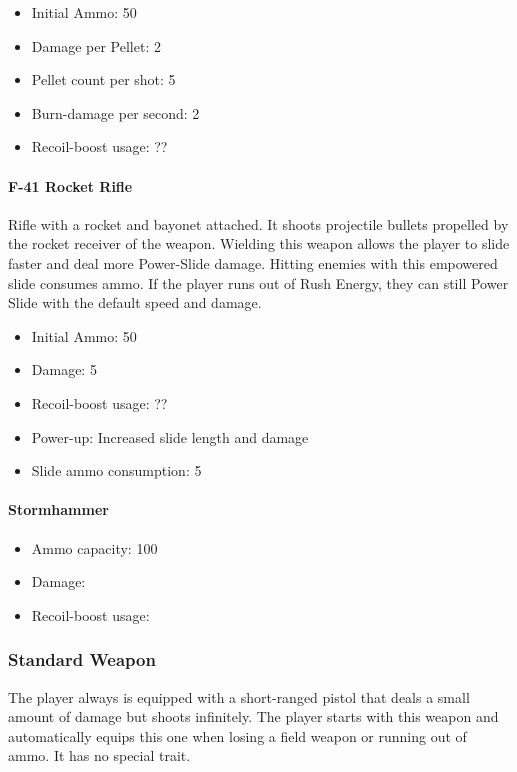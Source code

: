 \documentclass[12pt]{article}
\begin{document}
\begin{itemize}
	\item Initial Ammo: 50
	\item Damage per Pellet: 2
	\item Pellet count per shot: 5
	\item Burn-damage per second: 2
	\item Recoil-boost usage: ??
\end{itemize} 

\paragraph{F-41 Rocket Rifle}

Rifle with a rocket and bayonet attached. It shoots projectile bullets propelled by the rocket receiver of the weapon. Wielding this weapon allows the player to slide faster and deal more Power-Slide damage. Hitting enemies with this empowered slide consumes ammo. If the player runs out of Rush Energy, they can still Power Slide with the default speed and damage.

\begin{itemize}
	\item Initial Ammo: 50
	\item Damage: 5
	\item Recoil-boost usage: ??
	\item Power-up: Increased slide length and damage
	\item Slide ammo consumption: 5
\end{itemize} 

\paragraph{Stormhammer}

\begin{itemize}
	\item Ammo capacity: 100%
	\item Damage: 
	\item Recoil-boost usage:
\end{itemize}

\subsubsection{Standard Weapon}

The player always is equipped with a short-ranged pistol that deals a small amount of damage but shoots infinitely. The player starts with this weapon and automatically equips this one when losing a field weapon or running out of ammo. It has no special trait.
\end{document}
